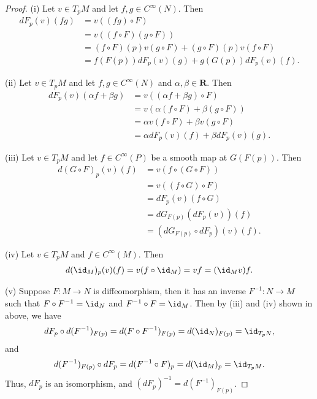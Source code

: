 \begin{proof}
    (i) Let $v \in T_pM$ and let $f, g \in C^\infty(N)$. Then
        \begin{align*}
            dF_p(v)(fg)
            &= v((fg) \circ F)\\
            &= v((f \circ F)(g \circ F))\\
            &= (f \circ F)(p)v(g \circ F) + (g \circ F)(p)v(f \circ F)\\
            &= f(F(p))dF_p(v)(g) + g(G(p))dF_p(v)(f).
        \end{align*}

    (ii) Let $v \in T_pM$ and let $f,g \in C^\infty(N)$ and $\alpha, \beta \in \mathbf{R}$. Then
        \begin{align*}
            dF_p(v)(\alpha f + \beta g)
            &= v((\alpha f + \beta g) \circ F)\\
            &= v(\alpha(f \circ F) + \beta(g \circ F))\\
            &= \alpha v(f \circ F) + \beta v(g \circ F)\\
            &= \alpha dF_p(v)(f) + \beta dF_p(v)(g).
        \end{align*}

    (iii) Let $v \in T_pM$ and let $f \in C^\infty(P)$ be a smooth map at $G(F(p))$. Then
        \begin{align*}
            d(G \circ F)_p(v)(f)
            &= v(f \circ (G \circ F))\\
            &= v((f \circ G) \circ F)\\
            &= dF_p(v)(f \circ G)\\
            &= dG_{F(p)}(dF_p(v))(f)\\
            &= (dG_{F(p)} \circ dF_p)(v)(f).
        \end{align*}

    (iv) Let $v \in T_pM$ and $f \in C^\infty(M)$. Then
        \begin{align*}
            d(\id_M)_p(v)(f)
            = v(f \circ \id_M)
            = vf
            = (\id_Mv)f.
        \end{align*}

    (v) Suppose $F : M \to N$ is diffeomorphism, then it has an inverse $F^{-1} : N \to M$ such that $F \circ F^{-1} = \id_N$ and $F^{-1} \circ F = \id_M$. Then by (iii) and (iv) shown in above, we have
        \begin{align*}
            dF_p \circ d(F^{-1})_{F(p)}
            = d(F \circ F^{-1})_{F(p)}
            = d(\id_N)_{F(p)}
            = \id_{T_pN},
        \end{align*}
    and
        \begin{align*}
            d(F^{-1})_{F(p)} \circ dF_p
            = d(F^{-1} \circ F)_p
            = d(\id_M)_p
            = \id_{T_pM}.
        \end{align*}
    Thus, $dF_p$ is an isomorphism, and $(dF_p)^{-1} = d(F^{-1})_{F(p)}$.
\end{proof}

